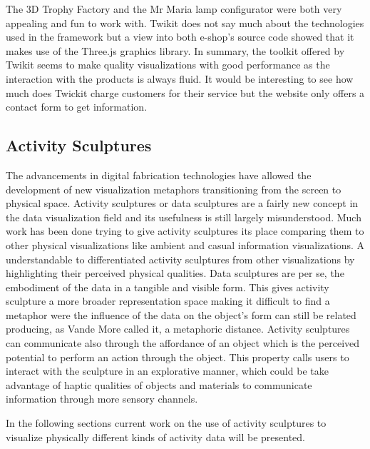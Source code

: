 \documentclass[../medieninformatik-arbeit.tex]{subfiles}
\begin{document}
The 3D Trophy Factory and the Mr Maria lamp configurator were both very appealing and fun to work with. Twikit does not say much about the technologies used in the framework but a view into both e-shop's source code showed that it makes use of the Three.js\cite{cabello2010three} graphics library. In summary, the toolkit offered by Twikit seems to make quality visualizations with good performance as the interaction with the products is always fluid. It would be interesting to see how much does Twickit charge customers for their service but the website only offers a contact form to get information.    

\subsection{Activity Sculptures}
The advancements in digital fabrication technologies have allowed the development of new visualization metaphors transitioning from the screen to physical space. Activity sculptures or data sculptures are a fairly new concept in the data visualization field and its usefulness is still largely misunderstood. Much work has been done trying to give activity sculptures its place comparing them to other physical visualizations like ambient and casual information visualizations\cite{jansen2013evaluating}. A understandable to differentiated activity sculptures from other visualizations by highlighting their perceived physical qualities\cite{vande2009analyzing,zhao2008embodiment}. Data sculptures are per se, the embodiment of the data in a tangible and visible form\cite{zhao2008embodiment}. This gives activity sculpture a more broader representation space making it difficult to find a metaphor were the influence of the data on the object's form can still be related producing, as Vande More called it, a metaphoric distance\cite{vande2009analyzing}. Activity sculptures can communicate also through the affordance of an object which is the perceived potential to perform an action through the object. This property calls users to interact with the sculpture in an explorative manner\cite{jansen2013evaluating,vande2008beyond}, which could be take advantage of haptic qualities of objects and materials to communicate information through more sensory channels\cite{bara2004visuo}. 

In the following sections current work on the use of activity sculptures to visualize physically different kinds of activity data will be presented. 
\end{document}
